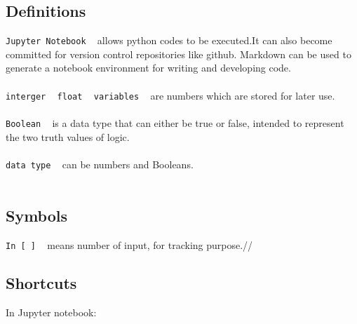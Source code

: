 \documentclass{article}
\begin{document}
{\subsection{\textbf{Definitions}}
\texttt{Jupyter Notebook} ~ allows python codes to be executed.It can also become committed for version control repositories like github. Markdown can be used to generate a notebook environment for writing and developing code. \\
\\
\texttt{interger} ~ 
\texttt{float} ~
\texttt{variables} ~ are numbers which are stored for later use. \\
\\
\texttt{Boolean} ~ is a data type that can either be true or false, intended to represent the two truth values of logic. \\
\\
\texttt{data type} ~ can be numbers and Booleans.\\
\\
\subsection{\textbf{Symbols}}
\texttt{In [~]} ~ means number of input, for tracking purpose.//


\subsection{\textbf{Shortcuts}}
In Jupyter notebook:\\
\\ 
\\
\\
\\
}
\end{document}
